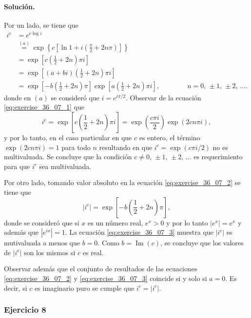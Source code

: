 \documentclass[a4paper]{report}
\renewcommand{\Im}{\operatorname{Im}}
\begin{document}
\paragraph{Solución.} Por un lado, se tiene que 
\begin{align}
 i^c&=e^{c\log i}\nonumber\\
  &\overset{(a)}{=}\exp\left\{c\left[\ln1+i\left(\frac{\pi}{2}+2n\pi\right)\right]\right\}\nonumber\\
  &=\exp\left[c\left(\frac{1}{2}+2n\right)\pi i\right]\label{eq:exercise_36_07_1}\\
  &=\exp\left[(a+bi)\left(\frac{1}{2}+2n\right)\pi i\right]\nonumber\\
  &=\exp\left[-b\left(\frac{1}{2}+2n\right)\pi\right]\exp\left[a\left(\frac{1}{2}+2n\right)\pi i\right],\qquad\qquad n=0,\,\pm1,\,\pm2,\,\dots.\label{eq:exercise_36_07_2}
\end{align}
donde en \((a)\) se consideró que \(i=e^{i\pi/2}\). Observar de la ecuación \ref{eq:exercise_36_07_1} que 
\[
 i^c=\exp\left[c\left(\frac{1}{2}+2n\right)\pi i\right]=\exp\left(\frac{c\pi i}{2}\right)\exp\left(2cn\pi i\right),
\]
y por lo tanto, en el caso particular en que \(c\) es entero, el término \(\exp\left(2cn\pi i\right)=1\) para todo \(n\) resultando en que \(i^c=\exp(c\pi i/2)\) no es multivaluada. Se concluye que la condición \(c\neq0,\,\pm1,\,\pm2,\,\dots\) es requerimiento para que \(i^c\) sea multivaluada.

Por otro lado, tomando valor absoluto en la ecuación \ref{eq:exercise_36_07_2} se tiene que
\begin{equation}\label{eq:exercise_36_07_3}
 |i^c|=\exp\left[-b\left(\frac{1}{2}+2n\right)\pi\right], 
\end{equation}
donde se consideró que si \(x\) es un número real, \(e^x>0\) y por lo tanto \(|e^x|=e^x\) y además que \(|e^{ix}|=1\). La ecuación \ref{eq:exercise_36_07_3} muestra que \(|i^c|\) es mutivaluada a menos que \(b=0\). Como \(b=\Im(c)\), se concluye que los valores de \(|i^c|\) son  los mismos si \(c\) es real.

Observar además que el conjunto de resultados de las ecuaciones \ref{eq:exercise_36_07_2} y \ref{eq:exercise_36_07_3} coincide si y solo si \(a=0\). Es decir, si \(c\) es imaginario puro se cumple que \(i^c=|i^c|\).

\subsubsection{Ejercicio 8}
\end{document}
